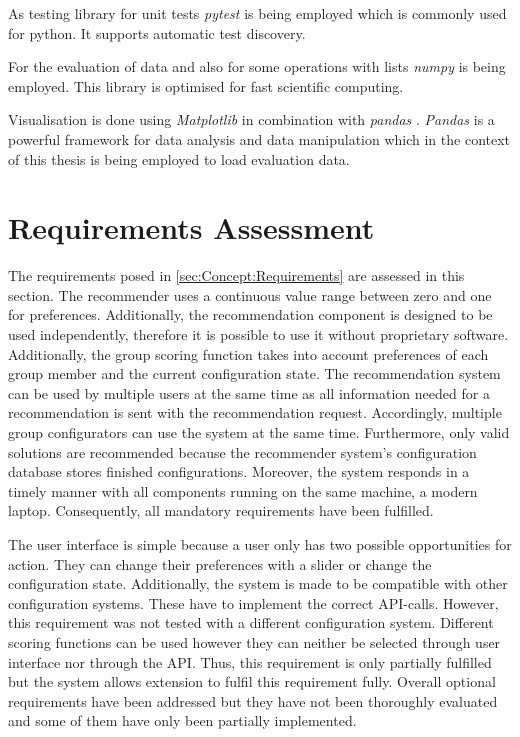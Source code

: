 As testing library for unit tests \emph{pytest} \cite{PytestDocumentation} is being employed which is commonly used for python. It supports automatic test discovery.

For the evaluation of data and also for some operations with lists \emph{numpy} \cite{NumPy} is being employed. This library is optimised for fast scientific computing. 

Visualisation is done using \emph{Matplotlib} \cite{MatplotlibDocumentation} in combination with \emph{pandas} \cite{PandasPythonData}. \emph{Pandas} is a powerful framework for data analysis and data manipulation which in the context of this thesis is being employed to load evaluation data.


\section{Requirements Assessment}
\label{sec:DesignImplementation:RequirementsAssesment}

The requirements posed in \autoref{sec:Concept:Requirements} are assessed in this section. The recommender uses a continuous value range between zero and one for preferences. Additionally, the recommendation component is designed to be used independently, therefore it is possible to use it without proprietary software.
Additionally, the group scoring function takes into account preferences of each group member and the current configuration state. The recommendation system can be used by multiple users at the same time as all information needed for a recommendation is sent with the recommendation request. Accordingly, multiple group configurators can use the system at the same time. Furthermore, only valid solutions are recommended because the recommender system's configuration database stores finished configurations. Moreover, the system responds in a timely manner with all components running on the same machine, a modern laptop.
Consequently, all mandatory requirements have been fulfilled.

The user interface is simple because a user only has two possible opportunities for action. They can change their preferences with a slider or change the configuration state. Additionally, the system is made to be compatible with other configuration systems. These have to implement the correct API-calls. However, this requirement was not tested with a different configuration system. Different scoring functions can be used however they can neither be selected through user interface nor through the API. Thus, this requirement is only partially fulfilled but the system allows extension to fulfil this requirement fully.
Overall optional requirements have been addressed but they have not been thoroughly evaluated and some of them have only been partially implemented.
